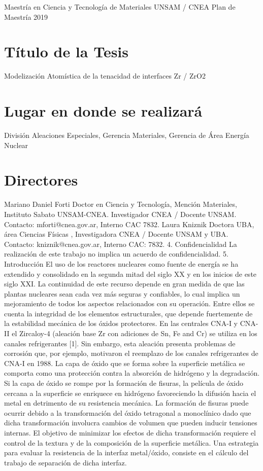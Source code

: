 ﻿
Maestría en Ciencia y Tecnología de Materiales UNSAM / CNEA
Plan de Maestría 2019

\section{ Título de la Tesis }

Modelización Atomística de la tenacidad de interfaces Zr / ZrO2

\section{ Lugar en donde se realizará }
División Aleaciones Especiales, Gerencia Materiales, Gerencia de Área Energía Nuclear

\section{Directores}
Mariano Daniel Forti
Doctor en Ciencia y Tecnología, Mención Materiales, Instituto Sabato UNSAM-CNEA. Investigador CNEA / Docente UNSAM. 
Contacto: mforti@cnea.gov.ar, Interno CAC 7832.
Laura Kniznik
Doctora UBA, área Ciencias Físicas , Investigadora CNEA / Docente UNSAM y UBA. Contacto: kniznik@cnea.gov.ar, Interno CAC: 7832.
4. Confidencialidad
La realización de este trabajo no implica un acuerdo de confidencialidad.
5. Introducción 
El uso de los reactores nucleares como fuente de energía se ha extendido y consolidado en la segunda mitad del siglo XX y en los inicios de este siglo XXI. La continuidad de este recurso depende en gran medida de que las plantas nucleares sean cada vez más seguras y confiables, lo cual implica un mejoramiento de todos los aspectos relacionados con su operación. Entre ellos se cuenta la integridad de los elementos estructurales, que depende fuertemente de la estabilidad mecánica de los óxidos protectores. En las centrales CNA-I y CNA-II el Zircaloy-4 (aleación base Zr con adiciones de Sn, Fe and Cr) se utiliza en los canales refrigerantes [1]. Sin embargo, esta aleación presenta problemas de corrosión que, por ejemplo, motivaron el reemplazo de los canales refrigerantes de CNA-I en 1988.
La capa de óxido que se forma sobre la superficie metálica se comporta como una protección contra la absorción de hidrógeno y la degradación. Si la capa de óxido se rompe por la formación de fisuras, la película de óxido cercana a la superficie se enriquece en hidrógeno favoreciendo la difusión hacia el metal en detrimento de su resistencia mecánica. La formación de fisuras puede ocurrir debido a la transformación del óxido tetragonal a monoclínico dado que dicha transformación involucra cambios de volumen que pueden inducir tensiones internas. El objetivo de minimizar los efectos de dicha transformación requiere el control de la textura y de la composición de la superficie metálica. Una estrategia para evaluar la resistencia de la interfaz metal/óxido, consiste en el cálculo del trabajo de separación de dicha interfaz.
